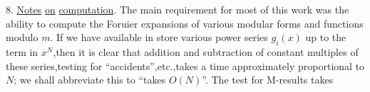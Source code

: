 8. \uline{Notes} \uline{on} \uline{computation}. The main requirement for most of this work was the ability to compute the Foruier expansions of various modular forms and functions modulo \uline{$m$}. If we have available in store various power series $g_{i}(x)$ up to the term in $x^{N}$,then it is clear that addition and subtraction of constant multiples of these series,testing for ``accidents'',etc.,takes a time approximately proportional to $N$; we shall abbreviate this to ``takes $O(N)$''. The test for M-results takes
\normalmarginpar
